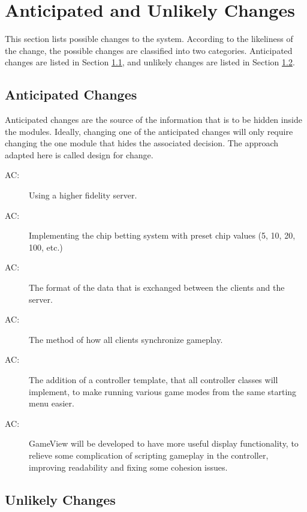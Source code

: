 \documentclass[12pt, titlepage]{article}
\newcounter{acnum}
\newcommand{\actheacnum}{AC\theacnum}
\begin{document}
\section{Anticipated and Unlikely Changes} \label{SecChange}

This section lists possible changes to the system. According to the likeliness
of the change, the possible changes are classified into two
categories. Anticipated changes are listed in Section \ref{SecAchange}, and
unlikely changes are listed in Section \ref{SecUchange}.

\subsection{Anticipated Changes} \label{SecAchange}

Anticipated changes are the source of the information that is to be hidden
inside the modules. Ideally, changing one of the anticipated changes will only
require changing the one module that hides the associated decision. The approach
adapted here is called design for
change.

\begin{description}
\item[ \actheacnum \label{acHardware}:] Using a higher fidelity server.
\item[ \actheacnum \label{acInput}:] Implementing the chip betting system with preset chip values (5, 10, 20, 100, etc.)
\item[ \actheacnum \label{acData}:] The format of the data that is exchanged between the clients and the server.
\item[ \actheacnum \label{acSync}:] The method of how all clients synchronize gameplay.
\item[ \actheacnum \label{acSync}:] The addition of a controller template, that all controller classes will implement, to make running various game modes from the same starting menu easier.
\item[ \actheacnum \label{acSync}:] GameView will be developed to have more useful display functionality, to relieve some complication of scripting gameplay in the controller, improving readability and fixing some cohesion issues.
\end{description}

\subsection{Unlikely Changes} \label{SecUchange}
\end{document}
